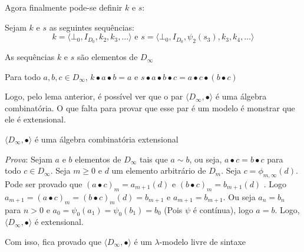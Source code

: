 \documentclass[../main.tex]{subfiles}
\begin{document}
Agora finalmente pode-se definir $k$ e $s$:

\begin{definition}
    Sejam $k$ e $s$ as seguintes sequências: $$k = \langle \bot_0, I_{D_0}, k_2, k_3, \dots \rangle \text{ e } s = \langle \bot_0, I_{D_0}, \psi_2(s_3), k_3, k_4, \dots \rangle$$
\end{definition}

\begin{lemma}
    As sequências $k$ e $s$ são elementos de $D_{\infty}$
\end{lemma}

\begin{lemma}
    Para todo $a, b, c \in D_{\infty}$, $k \bullet a \bullet b = a$ e $s \bullet a \bullet b \bullet c = a \bullet c \bullet (b \bullet c)$
\end{lemma}

Logo, pelo lema anterior, é possível ver que o par $\langle D_{\infty}, \bullet \rangle$ é uma álgebra combinatória. O que falta para provar que esse par é um modelo é monstrar que ele é extensional.

\begin{lemma}
    $\langle D_{\infty}, \bullet \rangle$ é uma álgebra combinatória extensional
\end{lemma}

\emph{Prova}: Sejam $a$ e $b$ elementos de $D_{\infty}$ tais que $a \sim b$, ou seja, $a \bullet c = b \bullet c$ para todo $c \in D_{\infty}$. Seja $m \geq 0$ e $d$ um elemento arbitrário de $D_{m}$. Seja $c = \phi_{m, \infty} (d)$. Pode ser provado que $(a \bullet c)_m = a_{m + 1} (d)$ e $(b \bullet c)_m = b_{m + 1} (d)$ . Logo $ a_{m + 1} = (a \bullet c)_m = (b \bullet c)_m(d) = b_{m+1}$ e $a_{m+1} = b_{m + 1}$. Ou seja $a_n = b_n$ para $n > 0$ e $a_0 = \psi_0(a_1) = \psi_0(b_1) = b_0$ (Pois $\psi$ é contínua), logo $a = b$. Logo, $\langle D_{\infty}, \bullet \rangle$ é extensional.

Com isso, fica provado que $\langle D_{\infty}, \bullet \rangle$ é um $\lambda$-modelo livre de sintaxe
\end{document}
